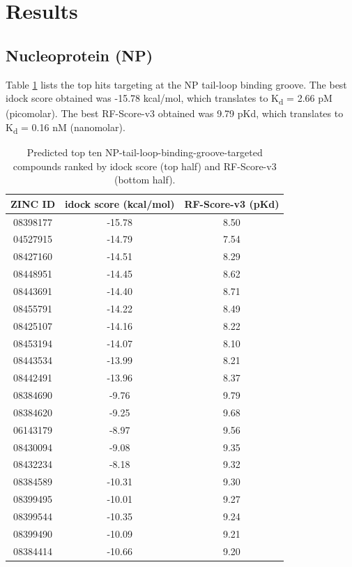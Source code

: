 \section{Results}

\subsection{Nucleoprotein (NP)}

Table \ref{influenza:2IQH-Hits-10} lists the top hits targeting at the NP tail-loop binding groove. The best idock score obtained was -15.78 kcal/mol, which translates to K\textsubscript{d} = 2.66 pM (picomolar). The best RF-Score-v3 obtained was 9.79 pKd, which translates to K\textsubscript{d} = 0.16 nM (nanomolar).

\begin{table}
\caption{Predicted top ten NP-tail-loop-binding-groove-targeted compounds ranked by idock score (top half) and RF-Score-v3 (bottom half).}
\label{influenza:2IQH-Hits-10}
\begin{tabular}{ccc}
\hline
ZINC ID & idock score (kcal/mol) & RF-Score-v3 (pKd)\\
\hline
08398177 & -15.78 & 8.50\\
04527915 & -14.79 & 7.54\\
08427160 & -14.51 & 8.29\\
08448951 & -14.45 & 8.62\\
08443691 & -14.40 & 8.71\\
08455791 & -14.22 & 8.49\\
08425107 & -14.16 & 8.22\\
08453194 & -14.07 & 8.10\\
08443534 & -13.99 & 8.21\\
08442491 & -13.96 & 8.37\\
\hline
08384690 &  -9.76 & 9.79\\
08384620 &  -9.25 & 9.68\\
06143179 &  -8.97 & 9.56\\
08430094 &  -9.08 & 9.35\\
08432234 &  -8.18 & 9.32\\
08384589 & -10.31 & 9.30\\
08399495 & -10.01 & 9.27\\
08399544 & -10.35 & 9.24\\
08399490 & -10.09 & 9.21\\
08384414 & -10.66 & 9.20\\
\hline
\end{tabular}
\end{table}

